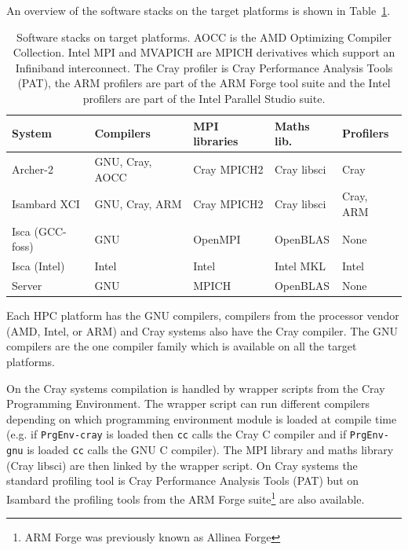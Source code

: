 \documentclass[a4paper,titlepage]{article}
\begin{document}
An overview of the software stacks on the target platforms is shown in Table~\ref{tab:software}. 
\begin{table}[htp]
\begin{center}
\begin{tabular}{|l|l|l|l|l|}
\hline 
System          & Compilers               & MPI libraries  & Maths lib.       & Profilers  \\
\hline
Archer-2        & GNU, Cray, AOCC         & Cray MPICH2     & Cray libsci     & Cray      \\
Isambard XCI    & GNU, Cray, ARM          & Cray MPICH2     & Cray libsci     & Cray, ARM \\
Isca (GCC-foss) & GNU                     & OpenMPI         & OpenBLAS        & None      \\
Isca (Intel)    & Intel                   & Intel           & Intel MKL       & Intel     \\
Server          & GNU                     & MPICH           & OpenBLAS        & None      \\
\hline
\end{tabular}
\end{center}
\caption{Software stacks on target platforms. AOCC is the AMD Optimizing Compiler Collection. Intel MPI and MVAPICH are MPICH derivatives which support an Infiniband interconnect.
The Cray profiler is Cray Performance Analysis Tools (PAT), the ARM profilers are part of the ARM Forge tool suite and the Intel profilers are part of the Intel Parallel Studio suite.}
\label{tab:software}
\end{table}
Each HPC platform has the GNU compilers, compilers from the processor vendor (AMD, Intel, or ARM) and Cray systems also have the Cray compiler. The GNU compilers are the one compiler family which is available on all the target platforms.

On the Cray systems compilation is handled by wrapper scripts from the Cray Programming Environment. The wrapper script can run different compilers depending on which programming environment module is loaded at compile time (e.g. if \texttt{PrgEnv-cray} is loaded then \texttt{cc} calls the Cray C compiler and if \texttt{PrgEnv-gnu} is loaded \texttt{cc} calls the GNU C compiler). The MPI library and maths library (Cray libsci) are then linked by the wrapper script. On Cray systems the standard profiling tool is Cray Performance Analysis Tools (PAT) but on Isambard the profiling tools from the ARM Forge suite\footnote{ARM Forge was previously known as Allinea Forge} are also available.
\end{document}
